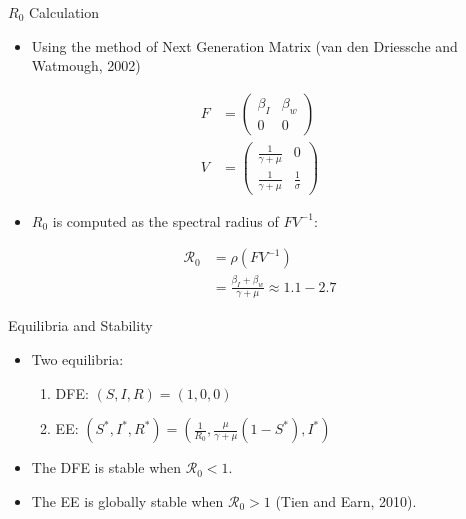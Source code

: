\documentclass{beamer}\usepackage[]{graphicx}\usepackage[]{color}
\begin{document}
\begin{frame}[t]{$R_0$ Calculation}
\begin{itemize}
\item Using the method of Next Generation Matrix (van den Driessche and Watmough, 2002)
\end{itemize}
\begin{align*}
		F&=\begin{pmatrix}
			\beta_I & \beta_w\\
			0 & 0
			\end{pmatrix}\\
		V&=\begin{pmatrix}
			\frac{1}{\gamma+\mu} & 0\\
			\frac{1}{\gamma+\mu} &\frac{1}{\sigma}
			\end{pmatrix}
\end{align*}
\begin{itemize}
\item $R_0$ is computed as the spectral radius of $FV^{-1}$:
\end{itemize}
\begin{align*}
    {\mathcal R_0} &= \rho(FV^{-1})\\
		           &=\frac{\beta_I+\beta_w}{\gamma+\mu} \approx 1.1 - 2.7
\end{align*}
\end{frame}

\begin{frame}{Equilibria and Stability}
\begin{itemize}
\setlength\itemsep{2em}
\item Two equilibria:\\[1em]
\begin{enumerate}
\setlength\itemsep{2em}
\item DFE: $(S,I,R)=(1,0,0)$
\item EE: $(S^{*},I^{*},R^{*}) = (\frac{1}{R_0}, \frac{\mu}{\gamma+\mu}(1-S^{*}), I^{*})$
\end{enumerate}
\item The DFE is stable when ${\mathcal R_0}<1$.
\item The EE is globally stable when ${\mathcal R_0}>1$ (Tien and Earn, 2010).
\end{itemize}
\end{frame}
\end{document}
